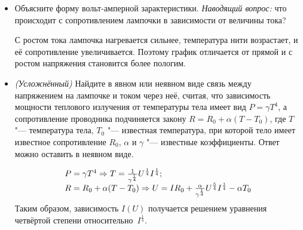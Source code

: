 \begin{itemize}
    \item Объясните форму вольт-амперной зарактеристики. {\itshape Наводящий вопрос:} что происходит с сопротивлением лампочки в зависимости от величины тока?\par
    \Answer С ростом тока лампочка нагревается сильнее, температура нити возрастает, и её сопротивление увеличивается. Поэтому график отличается от прямой и с ростом напряжения становится более пологим.
    \item {\itshape(Усложнённый)} Найдите в явном или неявном виде связь между напряжением на лампочке и током через неё, считая, что зависимость мощности теплового излучения от температуры тела имеет вид \(P = \gamma T^4\), а сопротивление проводника подчиняется закону \(R = R_0 + \alpha (T-T_0)\), где \(T\) "--- температура тела, \(T_0\) "--- известная температура, при которой тело имеет известное сопротивление \(R_0\), \(\alpha\) и \(\gamma\) "--- известные коэффициенты. Ответ можно оставить в неявном виде.\par
    \Answer \begin{equation*}
    	\begin{array}{@{}l@{}}
    		P = \gamma T^4 \Rightarrow T=\frac{1}{\gamma^\frac{1}{4}} U^\frac{1}{4} I^\frac{1}{4};\\
    		R = R_0 + \alpha(T-T_0) \Rightarrow U=IR_0+\frac{\alpha}{\gamma^\frac{1}{4}} U^\frac{5}{4} I^\frac{1}{4}-\alpha T_0
    	\end{array}
    \end {equation*}
    Таким образом, зависимость \(I(U)\) получается решением уравнения четвёртой степени относительно~\(I^\frac{1}{4}\).    
\end{itemize}
